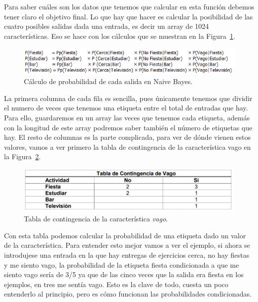 \documentclass[a4paper, 12pt]{book}
\begin{document}
Para saber cuáles son los datos que tenemos que calcular en esta función debemos tener claro el objetivo final. Lo que hay que hacer es calcular la posibilidad de las cuatro posibles salidas dada una entrada, es decir un array de 1024 características. Eso se hace con los cálculos que se muestran en la Figura~\ref{fig:probabilidadbayes}. 

\begin{figure}
	\centering
	\includegraphics[width=12cm, keepaspectratio]{img/probabilidadbayes}
	\caption{Cálculo de probabilidad de cada salida en Naive Bayes.}			
	\label{fig:probabilidadbayes}
\end{figure}

La primera columna de cada fila es sencilla, pues únicamente tenemos que dividir el numero de veces que tenemos una etiqueta entre el total de entradas que hay. Para ello, guardaremos en un array las veces que tenemos cada etiqueta, además con la longitud de este array podremos saber también el número de etiquetas que hay. 
El resto de columnas es la parte complicada, para ver de dónde vienen estos valores, vamos a ver primero la tabla de contingencia de la característica vago en la Figura~\ref{fig:tablavago}. 

\begin{figure}
	\centering
	\includegraphics[width=12cm, keepaspectratio]{img/tablavago}
	\caption{Tabla de contingencia de la característica \emph{vago}.}			
	\label{fig:tablavago}
\end{figure}

Con esta tabla podemos calcular la probabilidad de una etiqueta dado un valor de la característica. Para entender esto mejor vamos a ver el ejemplo, si ahora se introdujese una entrada en la que hay entregas de ejercicios cerca, no hay fiestas y me siento vago, la probabilidad de la etiqueta fiesta condicionada a que me siento vago sería de 3/5 ya que de las cinco veces que la salida era fiesta en los ejemplos, en tres me sentía vago. Esto es la clave de todo, cuesta un poco entenderlo al principio, pero es cómo funcionan las probabilidades condicionadas.
\end{document}
